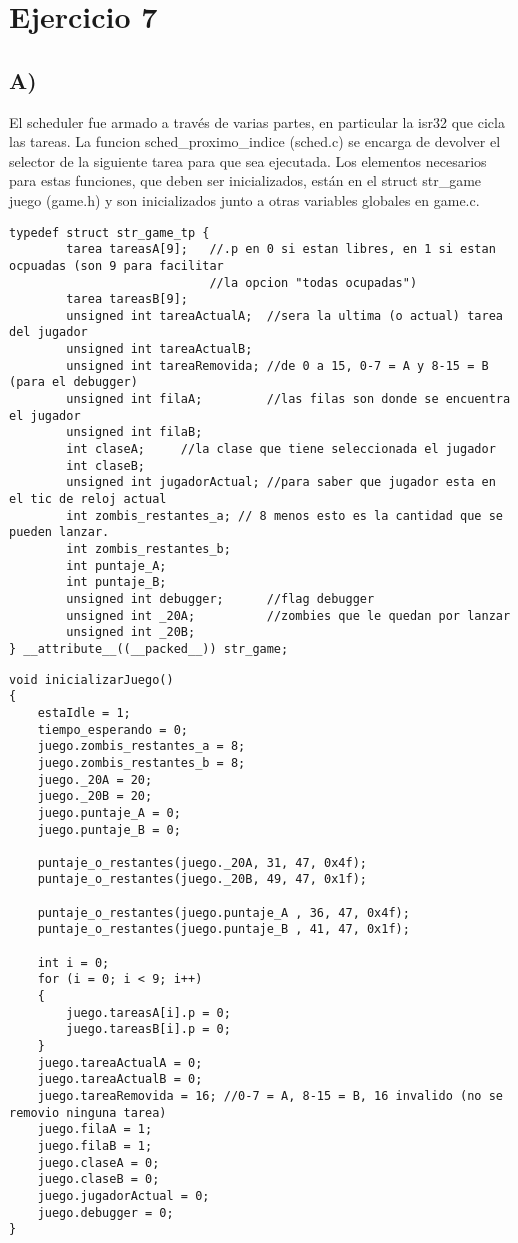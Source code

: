 \section{Ejercicio 7}
\subsection*{A)}
El scheduler fue armado a trav\'es de varias partes, en particular la isr32 que cicla las tareas. La funcion sched\_proximo\_indice (sched.c) se encarga de devolver el selector de 
la siguiente tarea para que sea ejecutada.
Los elementos necesarios para estas funciones, que deben ser inicializados, est\'an en el struct str\_game juego (game.h) y son inicializados junto a otras variables globales en 
game.c.
\begin{codesnippet}
\begin{verbatim}
typedef struct str_game_tp { 
		tarea tareasA[9];	//.p en 0 si estan libres, en 1 si estan ocpuadas (son 9 para facilitar
							//la opcion "todas ocupadas")
		tarea tareasB[9];
		unsigned int tareaActualA;	//sera la ultima (o actual) tarea del jugador
		unsigned int tareaActualB;
		unsigned int tareaRemovida;	//de 0 a 15, 0-7 = A y 8-15 = B (para el debugger)
		unsigned int filaA;			//las filas son donde se encuentra el jugador
		unsigned int filaB;
		int claseA;		//la clase que tiene seleccionada el jugador
		int claseB;
		unsigned int jugadorActual; //para saber que jugador esta en el tic de reloj actual
		int zombis_restantes_a; // 8 menos esto es la cantidad que se pueden lanzar.
		int zombis_restantes_b;
		int puntaje_A;
		int puntaje_B;
		unsigned int debugger;		//flag debugger
		unsigned int _20A;			//zombies que le quedan por lanzar
		unsigned int _20B;
} __attribute__((__packed__)) str_game;
\end{verbatim}
\end{codesnippet}
\begin{codesnippet}
\begin{verbatim}
void inicializarJuego()
{
	estaIdle = 1;
	tiempo_esperando = 0;
	juego.zombis_restantes_a = 8;
	juego.zombis_restantes_b = 8;
	juego._20A = 20;
	juego._20B = 20;
	juego.puntaje_A = 0;
	juego.puntaje_B = 0;
	
	puntaje_o_restantes(juego._20A, 31, 47, 0x4f);
	puntaje_o_restantes(juego._20B, 49, 47, 0x1f);

	puntaje_o_restantes(juego.puntaje_A , 36, 47, 0x4f);
	puntaje_o_restantes(juego.puntaje_B , 41, 47, 0x1f);

	int i = 0;
	for (i = 0; i < 9; i++)
	{
		juego.tareasA[i].p = 0;
		juego.tareasB[i].p = 0;
	}	
	juego.tareaActualA = 0;
	juego.tareaActualB = 0;
	juego.tareaRemovida = 16; //0-7 = A, 8-15 = B, 16 invalido (no se removio ninguna tarea)
	juego.filaA = 1;
	juego.filaB = 1;
	juego.claseA = 0;
	juego.claseB = 0;
	juego.jugadorActual = 0;
	juego.debugger = 0;
}
\end{verbatim}
\end{codesnippet}


